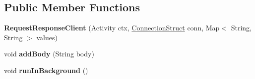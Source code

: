 \subsection*{Public Member Functions}
\begin{DoxyCompactItemize}
\item 
{\bfseries Request\+Response\+Client} (Activity ctx, \hyperlink{classcom_1_1example_1_1sebastian_1_1tindertp_1_1commonTools_1_1ConnectionStruct}{Connection\+Struct} conn, Map$<$ String, String $>$ values)\hypertarget{classcom_1_1example_1_1sebastian_1_1tindertp_1_1internetTools_1_1RequestResponseClient_ab8eae4838363c882d62b5493d14f6e08}{}\label{classcom_1_1example_1_1sebastian_1_1tindertp_1_1internetTools_1_1RequestResponseClient_ab8eae4838363c882d62b5493d14f6e08}

\item 
void {\bfseries add\+Body} (String body)\hypertarget{classcom_1_1example_1_1sebastian_1_1tindertp_1_1internetTools_1_1RequestResponseClient_a228a89ad52f3b0f34a2048c184660dfa}{}\label{classcom_1_1example_1_1sebastian_1_1tindertp_1_1internetTools_1_1RequestResponseClient_a228a89ad52f3b0f34a2048c184660dfa}

\item 
void {\bfseries run\+In\+Background} ()\hypertarget{classcom_1_1example_1_1sebastian_1_1tindertp_1_1internetTools_1_1RequestResponseClient_a21ad32685c310ca163854b714a61cd58}{}\label{classcom_1_1example_1_1sebastian_1_1tindertp_1_1internetTools_1_1RequestResponseClient_a21ad32685c310ca163854b714a61cd58}

\end{DoxyCompactItemize}
